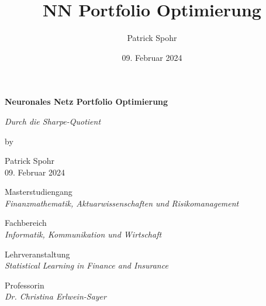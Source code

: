 \documentclass[12pt]{article}
\title{NN Portfolio Optimierung}
\date{09. Februar 2024}
\author{Patrick Spohr}
\begin{document}
    \begin{titlepage}
        
        \centering
        \Huge \textbf{Neuronales Netz Portfolio Optimierung}

        \vspace{7mm}
        
        \centering
        \Large \textit{Durch die Sharpe-Quotient} 

        \vspace{7mm}

        \centering
        \large by

        \vspace{7mm}

        \large Patrick Spohr
        \vspace{2mm}
        \\ 09. Februar 2024

        \vspace{30mm}

        \centering
        \large Masterstudiengang
        \vspace{1mm}
        \\ \normalsize \textit{Finanzmathematik, Aktuarwissenschaften und Risikomanagement} 

        \vspace{5mm}

        \centering
        \large Fachbereich
        \vspace{1mm}
        \\ \normalsize \textit{Informatik, Kommunikation und Wirtschaft} 

        \vspace{5mm}

        \centering
        \large Lehrveranstaltung 
        \vspace{1mm}       
        \\ \normalsize \textit{Statistical Learning in Finance and Insurance} 

        \vspace{5mm}

        \centering
        \large Professorin
        \vspace{1mm}
        \\ \normalsize \textit{Dr. Christina Erlwein-Sayer} 


    \end{titlepage}

    \hypertarget{inhalt}{\tableofcontents}
\end{document}
